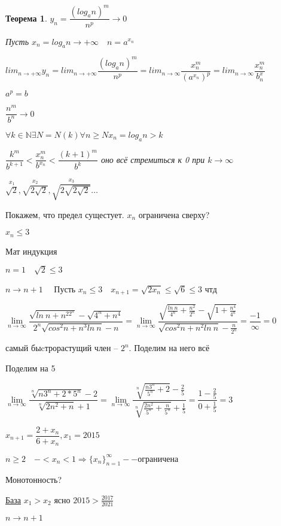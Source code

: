 \documentclass{book}
\newtheorem{Th}{Теорема}[chapter]
\begin{document}
\begin{Th}
	$y_n = \dfrac{(log_an)^m}{n^p} \to 0$
	
	Пусть $x_n = log_an\to +\infty\quad n = a^{x_n}$
	
	$lim_{n\to +\infty}y_n = lim_{n\to +\infty}\dfrac{(log_an)^m}{n^p} = lim_{n\to \infty} \dfrac{x_n^m}{(a^{x_n})^p}=lim_{n\to\infty}\dfrac{x_n^m}{b^x_n}$
	
	$a^p = b$
	
	$ \dfrac{n^m}{b^n}\to 0$
	
	$\forall k \in \mathds{N} \exists N = N(k) \forall n \geqslant N x_n = log_an > k$
	
	$\dfrac{k^m}{b^{k+1}}<\dfrac{x_n^m}{b^{x_n}}<\dfrac{(k+1)^m}{b^k}$ оно всё стремиться к 0 при $k\to \infty$
\end{Th}

$\overset{x_1}{\sqrt{2}}, \overset{x_2}{\sqrt{2\sqrt{2}}}, \overset{x_3}{\sqrt{2\sqrt{2\sqrt{2}}}} \hdots$

Покажем, что предел сущестует. $x_n$ ограничена сверху?

$x_n\leqslant 3$

Мат индукция

$n = 1 \quad \sqrt{2}\leqslant3$

$n\to n+1\quad $ Пусть $x_n\leqslant 3\quad x_{n+1}=\sqrt{2x_n}\leqslant\sqrt{6}\leqslant 3$ чтд

$\lim\limits_{n\to \infty}\dfrac{\sqrt{ln~n+n^22^n}- \sqrt{4^n+n^4}}{2^n\sqrt{cos^2n+n^3ln~n}-n} = \lim\limits_{n\to \infty}\dfrac{\sqrt{\frac{ln~n}{4^n}+\frac{n^2}{2^n}}-\sqrt{1+\frac{n^4}{4^n}}}{\sqrt{cos^2n+n^2ln~n}-\frac{n}{2^n}}=\dfrac{-1}{\infty} = 0$

самый быcтрорастущий член -- $2^n$. Поделим на него всё


Поделим на 5

$\lim\limits_{n\to \infty}\dfrac{\sqrt[n]{n3^n+2*5^n}-2}{\sqrt[n]{2n^2+n}+1}=\lim\limits_{n\to \infty}\dfrac{\sqrt[n]{\frac{n3^n}{5^n}+2}-\frac{2}{5}}{\sqrt[n]{\frac{2n^2}{5^n}+\frac{n}{5^n}}+\frac{1}{5}}= \dfrac{1-\frac{2}{5}}{0+\frac{1}{5}}=3$



$x_{n+1}=\dfrac{2+x_n}{6+x_n}, x_1 = 2015$

$n\geqslant 2\quad -<x_n<1 \Rightarrow \{x_n\}^{\infty}_{n=1} -- ограничена$

Монотонность?

\underline{База} $x_1>x_2$ ясно $2015 > \frac{2017}{2021}$

$n\to n+1$ 
\end{document}
